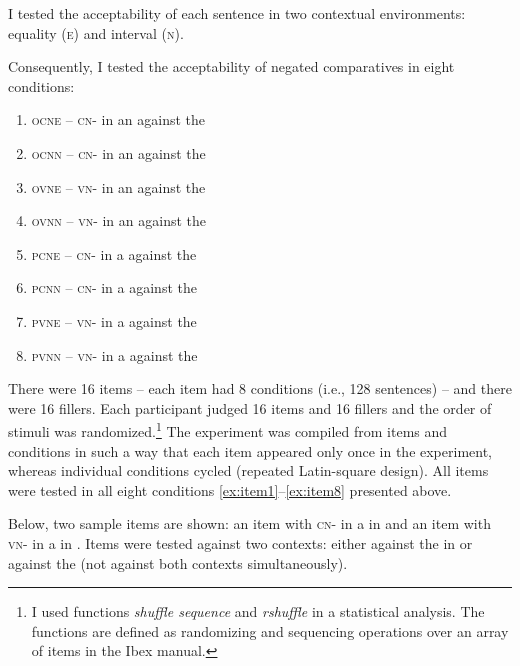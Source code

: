 \documentclass[output=paper, colorlinks, citecolor=brown, newtxmath]{langsci/langscibook}
\begin{document}
I tested the acceptability of each sentence in two contextual environments:  equality (\textsc{e}) and interval (\textsc{n}).

Consequently, I tested the acceptability of negated comparatives in eight conditions:
\begin{enumerate}
\item \textsc{ocne} -- \textsc{cn-} in an  against the  \label{ex:item1}
\item \textsc{ocnn} -- \textsc{cn-} in an  against the 
\item \textsc{ovne} -- \textsc{vn-} in an  against the 
\item \textsc{ovnn} -- \textsc{vn-} in an  against the 
\item \textsc{pcne} -- \textsc{cn-} in a  against the 
\item \textsc{pcnn} -- \textsc{cn-} in a  against the 
\item \textsc{pvne} -- \textsc{vn-} in a  against the 
\item \textsc{pvnn} -- \textsc{vn-} in a  against the  \label{ex:item8}
\end{enumerate}

\noindent There were 16 items -- each item had 8 conditions (i.e., 128 sentences) -- and there were 16 fillers. Each participant judged 16 items and 16 fillers and the order of stimuli was randomized.\footnote{I used functions \textit{shuffle sequence} and \textit{rshuffle} in a statistical analysis. The functions are defined as randomizing and sequencing operations over an array of items in the Ibex manual.} The experiment was compiled from items and conditions in such a way that each item appeared only once in the experiment, whereas individual conditions cycled (repeated Latin-square design). All items were tested in all eight conditions \ref{ex:item1}--\ref{ex:item8} presented above.

Below, two sample items are shown: an item with \textsc{cn-} in a  in  and an item with \textsc{vn-} in a  in . Items were tested against two contexts: either against the  in  or against the   (not against both contexts simultaneously).
\end{document}
